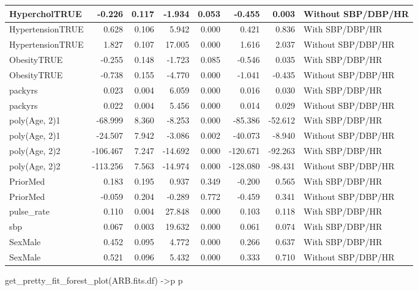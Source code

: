 \documentclass[
]{article}
\newenvironment{Shaded}{\begin{snugshade}}{\end{snugshade}}
\newcommand{\FunctionTok}[1]{\textcolor[rgb]{0.00,0.00,0.00}{#1}}
\newcommand{\NormalTok}[1]{#1}
\newcommand{\OtherTok}[1]{\textcolor[rgb]{0.56,0.35,0.01}{#1}}
\begin{document}
\begin{table}
\begin{tabular}[t]{l|r|r|r|r|r|r|l}
\hline
HypercholTRUE & -0.226 & 0.117 & -1.934 & 0.053 & -0.455 & 0.003 & Without SBP/DBP/HR\\
\hline
HypertensionTRUE & 0.628 & 0.106 & 5.942 & 0.000 & 0.421 & 0.836 & With SBP/DBP/HR\\
\hline
HypertensionTRUE & 1.827 & 0.107 & 17.005 & 0.000 & 1.616 & 2.037 & Without SBP/DBP/HR\\
\hline
ObesityTRUE & -0.255 & 0.148 & -1.723 & 0.085 & -0.546 & 0.035 & With SBP/DBP/HR\\
\hline
ObesityTRUE & -0.738 & 0.155 & -4.770 & 0.000 & -1.041 & -0.435 & Without SBP/DBP/HR\\
\hline
packyrs & 0.023 & 0.004 & 6.059 & 0.000 & 0.016 & 0.030 & With SBP/DBP/HR\\
\hline
packyrs & 0.022 & 0.004 & 5.456 & 0.000 & 0.014 & 0.029 & Without SBP/DBP/HR\\
\hline
poly(Age, 2)1 & -68.999 & 8.360 & -8.253 & 0.000 & -85.386 & -52.612 & With SBP/DBP/HR\\
\hline
poly(Age, 2)1 & -24.507 & 7.942 & -3.086 & 0.002 & -40.073 & -8.940 & Without SBP/DBP/HR\\
\hline
poly(Age, 2)2 & -106.467 & 7.247 & -14.692 & 0.000 & -120.671 & -92.263 & With SBP/DBP/HR\\
\hline
poly(Age, 2)2 & -113.256 & 7.563 & -14.974 & 0.000 & -128.080 & -98.431 & Without SBP/DBP/HR\\
\hline
PriorMed & 0.183 & 0.195 & 0.937 & 0.349 & -0.200 & 0.565 & With SBP/DBP/HR\\
\hline
PriorMed & -0.059 & 0.204 & -0.289 & 0.772 & -0.459 & 0.341 & Without SBP/DBP/HR\\
\hline
pulse\_rate & 0.110 & 0.004 & 27.848 & 0.000 & 0.103 & 0.118 & With SBP/DBP/HR\\
\hline
sbp & 0.067 & 0.003 & 19.632 & 0.000 & 0.061 & 0.074 & With SBP/DBP/HR\\
\hline
SexMale & 0.452 & 0.095 & 4.772 & 0.000 & 0.266 & 0.637 & With SBP/DBP/HR\\
\hline
SexMale & 0.521 & 0.096 & 5.432 & 0.000 & 0.333 & 0.710 & Without SBP/DBP/HR\\
\hline
\end{tabular}
\end{table}

\begin{Shaded}
\begin{Highlighting}[]
\FunctionTok{get\_pretty\_fit\_forest\_plot}\NormalTok{(ARB.fits.df) }\OtherTok{{-}\textgreater{}}\NormalTok{p}
\NormalTok{p}
\end{Highlighting}
\end{Shaded}
\end{document}
